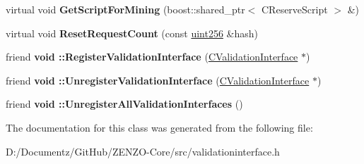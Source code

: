 \begin{DoxyCompactItemize}
\item 
\mbox{\label{class_c_validation_interface_a0aa027d3fd8689cbc849e558965d0c6d}} 
virtual void {\bfseries Get\+Script\+For\+Mining} (boost\+::shared\+\_\+ptr$<$ C\+Reserve\+Script $>$ \&)
\item 
\mbox{\label{class_c_validation_interface_aef71b9e7286b9344730e654e836a2ccd}} 
virtual void {\bfseries Reset\+Request\+Count} (const \mbox{\hyperlink{classuint256}{uint256}} \&hash)
\item 
\mbox{\label{class_c_validation_interface_aa7a5e52b8950b16b3c14391809047ca6}} 
friend {\bfseries void \+::\+Register\+Validation\+Interface} (\mbox{\hyperlink{class_c_validation_interface}{C\+Validation\+Interface}} $\ast$)
\item 
\mbox{\label{class_c_validation_interface_aaed3b260b3de64ed423a9a24bf0e29f4}} 
friend {\bfseries void \+::\+Unregister\+Validation\+Interface} (\mbox{\hyperlink{class_c_validation_interface}{C\+Validation\+Interface}} $\ast$)
\item 
\mbox{\label{class_c_validation_interface_a7234df2b6e1a079260489eea6eb6eb72}} 
friend {\bfseries void \+::\+Unregister\+All\+Validation\+Interfaces} ()
\end{DoxyCompactItemize}


The documentation for this class was generated from the following file\+:\begin{DoxyCompactItemize}
\item 
D\+:/\+Documentz/\+Git\+Hub/\+Z\+E\+N\+Z\+O-\/\+Core/src/validationinterface.\+h\end{DoxyCompactItemize}
